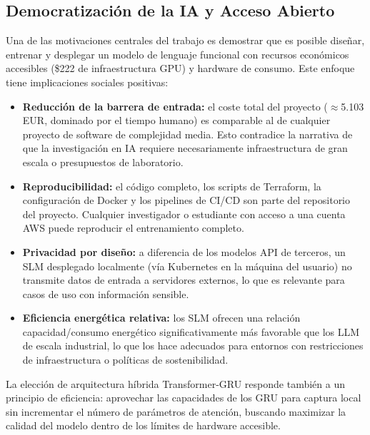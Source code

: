 \subsection{Democratización de la IA y Acceso Abierto}

Una de las motivaciones centrales del trabajo es demostrar que es posible diseñar, entrenar y desplegar un modelo de lenguaje funcional con recursos económicos accesibles (\$222 de infraestructura GPU) y hardware de consumo. Este enfoque tiene implicaciones sociales positivas:

\begin{itemize}
    \item \textbf{Reducción de la barrera de entrada:} el coste total del proyecto ($\approx$5.103 EUR, dominado por el tiempo humano) es comparable al de cualquier proyecto de software de complejidad media. Esto contradice la narrativa de que la investigación en IA requiere necesariamente infraestructura de gran escala o presupuestos de laboratorio.
    \item \textbf{Reproducibilidad:} el código completo, los scripts de Terraform, la configuración de Docker y los pipelines de CI/CD son parte del repositorio del proyecto. Cualquier investigador o estudiante con acceso a una cuenta AWS puede reproducir el entrenamiento completo.
    \item \textbf{Privacidad por diseño:} a diferencia de los modelos API de terceros, un SLM desplegado localmente (vía Kubernetes en la máquina del usuario) no transmite datos de entrada a servidores externos, lo que es relevante para casos de uso con información sensible.
    \item \textbf{Eficiencia energética relativa:} los SLM ofrecen una relación capacidad/consumo energético significativamente más favorable que los LLM de escala industrial, lo que los hace adecuados para entornos con restricciones de infraestructura o políticas de sostenibilidad.
\end{itemize}

La elección de arquitectura híbrida Transformer-GRU responde también a un principio de eficiencia: aprovechar las capacidades de los GRU para captura local sin incrementar el número de parámetros de atención, buscando maximizar la calidad del modelo dentro de los límites de hardware accesible.

